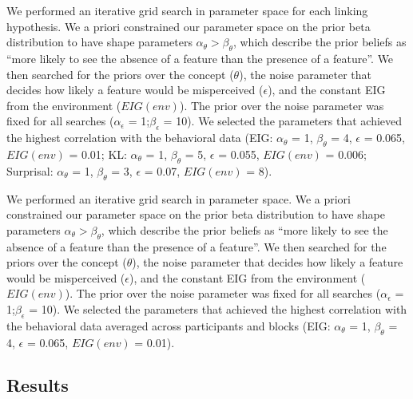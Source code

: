 \documentclass[10pt, letterpaper]{article}
\begin{document}
We performed an iterative grid search in parameter space for each
linking hypothesis. We a priori constrained our parameter space on the
prior beta distribution to have shape parameters
\(\alpha_{\theta} > \beta_{\theta}\), which describe the prior beliefs
as ``more likely to see the absence of a feature than the presence of a
feature''. We then searched for the priors over the concept
(\(\theta\)), the noise parameter that decides how likely a feature
would be misperceived (\(\epsilon\)), and the constant EIG from the
environment (\(EIG(env)\)). The prior over the noise parameter was fixed
for all searches (\(\alpha_{\epsilon}\) = 1;\(\beta_{\epsilon}\) = 10).
We selected the parameters that achieved the highest correlation with
the behavioral data (EIG: \(\alpha_{\theta}\) = 1, \(\beta_{\theta}\) =
4, \(\epsilon\) = 0.065, \(EIG(env)\) = 0.01; KL: \(\alpha_{\theta}\) =
1, \(\beta_{\theta}\) = 5, \(\epsilon\) = 0.055, \(EIG(env)\) = 0.006;
Surprisal: \(\alpha_{\theta}\) = 1, \(\beta_{\theta}\) = 3, \(\epsilon\)
= 0.07, \(EIG(env)\) = 8).

We performed an iterative grid search in parameter space. We a priori
constrained our parameter space on the prior beta distribution to have
shape parameters \(\alpha_{\theta} > \beta_{\theta}\), which describe
the prior beliefs as ``more likely to see the absence of a feature than
the presence of a feature''. We then searched for the priors over the
concept (\(\theta\)), the noise parameter that decides how likely a
feature would be misperceived (\(\epsilon\)), and the constant EIG from
the environment (\(EIG(env)\)). The prior over the noise parameter was
fixed for all searches (\(\alpha_{\epsilon}\) = 1;\(\beta_{\epsilon}\) =
10). We selected the parameters that achieved the highest correlation
with the behavioral data averaged across participants and blocks (EIG:
\(\alpha_{\theta}\) = 1, \(\beta_{\theta}\) = 4, \(\epsilon\) = 0.065,
\(EIG(env)\) = 0.01).

\hypertarget{results-1}{%
\subsection{Results}\label{results-1}}
\end{document}
